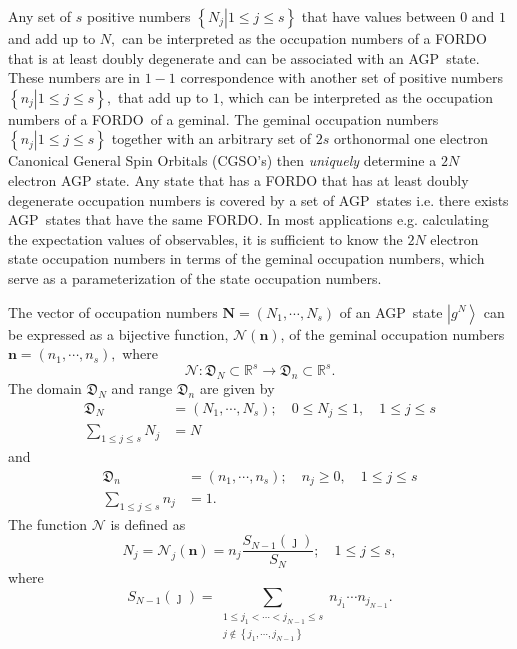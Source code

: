 \documentclass[aps,preprint]{revtex4}%
\begin{document}
Any set of $s$ positive numbers $\left\{  \left.  N_{j}\right\vert 1\leq j\leq
s\right\}  $ that have values between $0$ and $1$ and add up to $N,$ can be
interpreted as the occupation numbers of a FORDO that is at least doubly
degenerate and can be associated with an AGP\ state. These numbers are in
$1-1$ correspondence with another set of positive numbers $\left\{  \left.
n_{j}\right\vert 1\leq j\leq s\right\}  ,$ that add up to $1$, which can be
interpreted as the occupation numbers of a FORDO\ of a geminal. The geminal
occupation numbers $\left\{  \left.  n_{j}\right\vert 1\leq j\leq s\right\}  $
together with an arbitrary set of $2s$ orthonormal one electron Canonical
General Spin Orbitals (CGSO's) then \emph{uniquely }determine a $2N$ electron
AGP state. Any state that has a FORDO that has at least doubly degenerate
occupation numbers is covered by a set of AGP\ states i.e. there exists
AGP\ states that have the same FORDO. In most applications e.g. calculating
the expectation values of observables, it is sufficient to know the $2N$
electron state occupation numbers in terms of the geminal occupation numbers,
which serve as a parameterization of the state occupation numbers.

The vector of occupation numbers $\mathbf{N}=\left(  N_{1},\cdots
,N_{s}\right)  $ of an AGP\ state $\left\vert g^{N}\right\rangle $ can be
expressed as a bijective function, $\mathcal{N}\left(  \mathbf{n}\right)  $,
of the geminal occupation numbers $\mathbf{n}=\left(  n_{1},\cdots
,n_{s}\right)  ,$ where
\begin{equation}
\mathcal{N}:\mathfrak{D}_{N}\subset\mathbb{R}^{s}\rightarrow\mathfrak{D}%
_{n}\subset\mathbb{R}^{s}.
\end{equation}
The domain $\mathfrak{D}_{N}$ and range $\mathfrak{D}_{n}$ are given by%
\begin{align}
\mathfrak{D}_{N}  &  =\left(  N_{1},\cdots,N_{s}\right)  ;\quad0\leq N_{j}%
\leq1,\quad1\leq j\leq s\nonumber\\
\sum_{1\leq j\leq s}N_{j}  &  =N
\end{align}
and
\begin{align}
\mathfrak{D}_{n}  &  =\left(  n_{1},\cdots,n_{s}\right)  ;\quad n_{j}%
\geq0,\quad1\leq j\leq s\nonumber\\
\sum_{1\leq j\leq s}n_{j}  &  =1.
\end{align}
The function $\mathcal{N}$ is defined as
\begin{equation}
N_{j}=\mathcal{N}_{j}\left(  \mathbf{n}\right)  =n_{j}\frac{S_{N-1}\left(
\jmath\right)  }{S_{N}};\quad1\leq j\leq s,
\end{equation}
where
\begin{equation}
S_{N-1}\left(  \jmath\right)  =\sum_{\substack{1\leq j_{1}<\cdots<j_{N-1}\leq
s\\j\notin\left\{  j_{1},\cdots,j_{N-1}\right\}  }}n_{j_{1}}\cdots n_{j_{N-1}%
}.
\end{equation}
\end{document}
